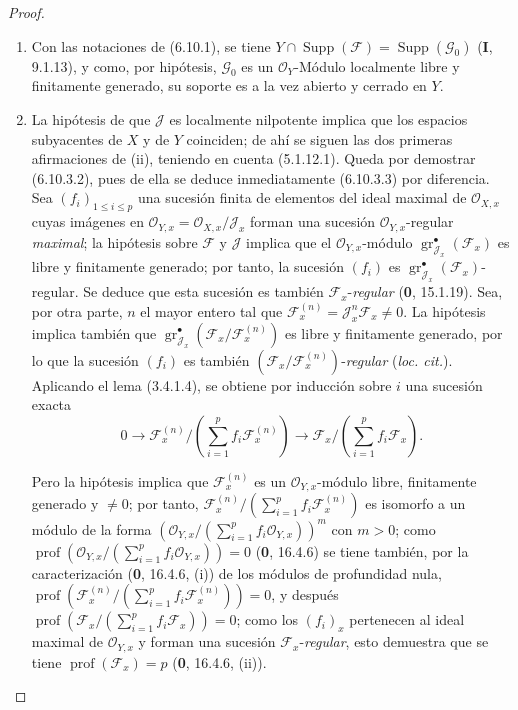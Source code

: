 \begin{proof}
\begin{enumerate}
\item[(i)] Con las notaciones de (6.10.1), se tiene
$Y\cap\operatorname{Supp}(\mathcal F)=\operatorname{Supp}(\mathcal G_0)$
(\textbf I, 9.1.13), y como, por hipótesis, $\mathcal G_0$ es un
$\mathcal O_Y$-Módulo localmente libre y finitamente generado, su soporte es a la vez
abierto y cerrado en $Y$.


\item[(ii)] La hipótesis de que $\mathcal J$ es localmente nilpotente implica que
los espacios subyacentes de $X$ y de $Y$ coinciden; de ahí se siguen las dos primeras
afirmaciones de (ii), teniendo en cuenta (5.1.12.1). Queda por demostrar (6.10.3.2),
pues de ella se deduce inmediatamente (6.10.3.3) por diferencia. Sea
$(f_i)_{1\leq i\leq p}$ una sucesión finita de elementos del ideal maximal de
$\mathcal O_{X,x}$ cuyas imágenes en
$\mathcal O_{Y,x}=\mathcal O_{X,x}/\mathcal J_x$ forman una sucesión
$\mathcal O_{Y,x}$-regular \emph{maximal}; la hipótesis sobre $\mathcal F$ y
$\mathcal J$ implica que el $\mathcal O_{Y,x}$-módulo
$\operatorname{gr}_{\mathcal J_x}^{\bullet}(\mathcal F_x)$ es libre y finitamente
generado; por tanto, la sucesión $(f_i)$ es
$\operatorname{gr}_{\mathcal J_x}^{\bullet}(\mathcal F_x)$-regular. Se
deduce que esta sucesión es también $\mathcal F_x$-\emph{regular} (\textbf 0, 15.1.19). Sea,
por otra parte, $n$ el mayor entero tal que
$\mathcal F_x^{(n)}=\mathcal J_x^n\mathcal F_x\ne0$. La hipótesis implica
también que
$\operatorname{gr}_{\mathcal J_x}^{\bullet}
(\mathcal F_x/\mathcal F_x^{(n)})$ es libre y finitamente generado, por lo que la sucesión
$(f_i)$ es también $(\mathcal F_x/\mathcal F_x^{(n)})$-\emph{regular}
(\emph{loc. cit.}). Aplicando el lema (3.4.1.4), se obtiene por inducción
sobre $i$ una sucesión exacta
\[
0\longrightarrow
\mathcal F_x^{(n)}/\left(\sum_{i=1}^{p}f_i\mathcal F_x^{(n)}\right)
\longrightarrow
\mathcal F_x/\left(\sum_{i=1}^{p}f_i\mathcal F_x\right).
\]

Pero la hipótesis implica que $\mathcal F_x^{(n)}$ es un
$\mathcal O_{Y,x}$-módulo libre, finitamente generado y $\ne0$; por tanto,
$\mathcal F_x^{(n)}/(\sum_{i=1}^{p}f_i\mathcal F_x^{(n)})$ es isomorfo a
un módulo de la forma
$(\mathcal O_{Y,x}/(\sum_{i=1}^{p}f_i\mathcal O_{Y,x}))^m$ con $m>0$; como
$\operatorname{prof}(\mathcal O_{Y,x}/(\sum_{i=1}^{p}f_i\mathcal O_{Y,x}))=0$
(\textbf 0, 16.4.6) se tiene también, por la caracterización (\textbf 0, 16.4.6, (i)) de los módulos
de profundidad nula,
$\operatorname{prof}(\mathcal F_x^{(n)}/(\sum_{i=1}^{p}f_i\mathcal F_x^{(n)}))=0$,
y después
$\operatorname{prof}(\mathcal F_x/(\sum_{i=1}^{p}f_i\mathcal F_x))=0$;
como los $(f_i)_x$ pertenecen al ideal maximal de $\mathcal O_{Y,x}$ y forman
una sucesión $\mathcal F_x$-\emph{regular}, esto demuestra que se tiene
$\operatorname{prof}(\mathcal F_x)=p$ (\textbf 0, 16.4.6, (ii)).
\end{enumerate}
\end{proof}

